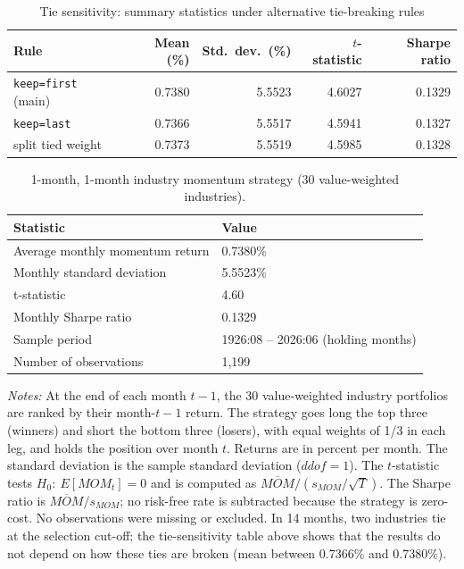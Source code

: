 \documentclass[11pt]{article}
\begin{document}
\begin{table}[H]
\centering
\caption*{Tie sensitivity: summary statistics under alternative tie-breaking rules}
\begin{tabular}{lrrrr}
\toprule
Rule & Mean (\%) & Std.\ dev.\ (\%) & $t$-statistic & Sharpe ratio \\
\midrule
 
\texttt{keep=\textquotesingle{}first\textquotesingle{}} (main) & 0.7380 & 5.5523 & 4.6027 & 0.1329 \\
\texttt{keep=\textquotesingle{}last\textquotesingle{}} & 0.7366 & 5.5517 & 4.5941 & 0.1327 \\
split tied weight & 0.7373 & 5.5519 & 4.5985 & 0.1328 \\
\bottomrule
\end{tabular}
\end{table}
 
\begin{table}[H]
\centering
\caption{1-month, 1-month industry momentum strategy (30 value-weighted industries).}
\label{tab:mom11}
\begin{tabular}{ll}
\toprule
Statistic & Value \\
\midrule
Average monthly momentum return & 0.7380\% \\
Monthly standard deviation & 5.5523\% \\
t-statistic & 4.60 \\
Monthly Sharpe ratio & 0.1329 \\
Sample period & 1926:08 – 2026:06 (holding months) \\
Number of observations & 1,199 \\
\bottomrule
\end{tabular}
\end{table}
 
\emph{Notes:} At the end of each month $t-1$, the 30 value-weighted industry portfolios are ranked by their month-$t-1$ return. The strategy goes long the top three (winners) and short the bottom three (losers), with equal weights of 1/3 in each leg, and holds the position over month $t$. Returns are in percent per month. The standard deviation is the sample standard deviation ($ddof=1$). The $t$-statistic tests $H_0:\ E[MOM_t]=0$ and is computed as $\overline{MOM}/(s_{MOM}/\sqrt{T})$. The Sharpe ratio is $\overline{MOM}/s_{MOM}$; no risk-free rate is subtracted because the strategy is zero-cost. No observations were missing or excluded. In 14 months, two industries tie at the selection cut-off; the tie-sensitivity table above shows that the results do not depend on how these ties are broken (mean between 0.7366\% and 0.7380\%).
 
\end{document}
